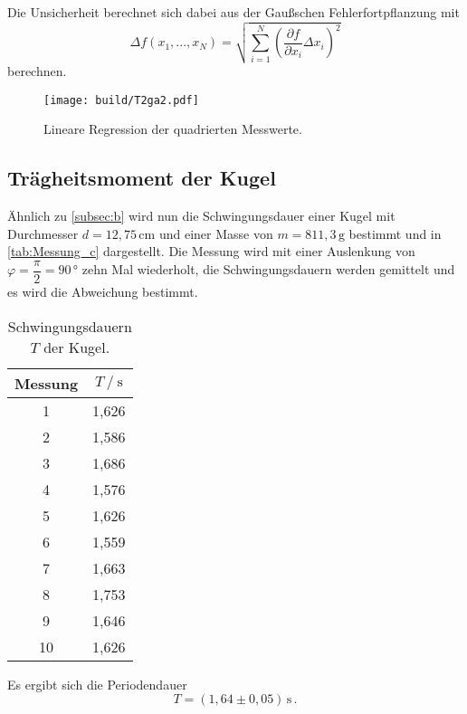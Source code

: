 Die Unsicherheit berechnet sich dabei aus der Gaußschen Fehlerfortpflanzung mit
\begin{equation}
  Δf(x_1,...,x_N) = \sqrt{\sum_{i=1}^N \left(\frac{\partial f}{\partial x_i}Δx_i\right)^2}
  \label{eq:gaußfehler}
\end{equation}
berechnen.

\begin{figure}[H]
  \centering
  \texttt{[image: build/T2ga2.pdf]}
  \caption{Lineare Regression der quadrierten Messwerte.}
  \label{fig:T2ga2}
\end{figure}

\subsection{Trägheitsmoment der Kugel}
\label{subsec:c}

Ähnlich zu \autoref{subsec:b} wird nun die Schwingungsdauer einer Kugel mit Durchmesser $d = 12,75 \, \unit{\centi\meter}$ und einer Masse von $m = 811,3 \,\unit{\gram}$ bestimmt und in \autoref{tab:Messung_c} dargestellt.
Die Messung wird mit einer Auslenkung von $\varphi = \dfrac{π}{2} = 90 \,\unit{\degree}$ zehn Mal wiederholt, die Schwingungsdauern werden gemittelt und es wird die Abweichung bestimmt.

\begin{table}[H] %
  \centering
  \begin{tabular}{S[table-format=2.0] S[table-format=1.2]}
      \toprule
      {Messung} & {$T \mathbin{/} \unit{\second}$}\\
        & 1,626 \\
          2  & 1,586 \\
          3  & 1,686 \\
          4  & 1,576 \\  
          5  & 1,626 \\
          6  & 1,559 \\
          7  & 1,663 \\
          8  & 1,753 \\
          9  & 1,646 \\
          10 & 1,626 \\
      \bottomrule
  \end{tabular}
  \caption{Schwingungsdauern $T$ der Kugel.}
  \label{tab:Messung_c}
\end{table}
Es ergibt sich die Periodendauer
\begin{equation*}
  T= (1,64 \pm 0,05) \, \unit{\second} \,.
\end{equation*}

